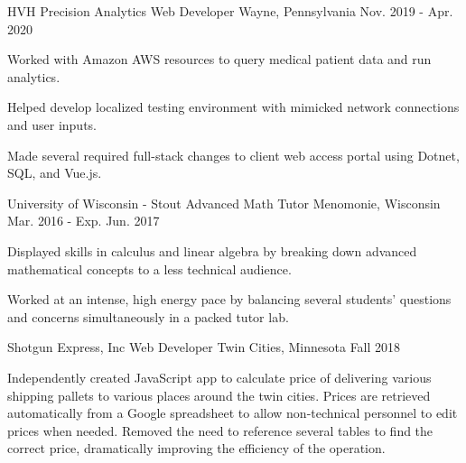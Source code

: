 \begin{cventries}
  \cventry
    {HVH Precision Analytics} %
    {Web Developer} %
    {Wayne, Pennsylvania} %
    {Nov. 2019 - Apr. 2020} %
    {
      \begin{cvitems} %
        \item {Worked with Amazon AWS resources to query medical patient data and run analytics.}
        \item {Helped develop localized testing environment with mimicked network connections and user inputs.}
        \item {Made several required full-stack changes to client web access portal using Dotnet, SQL, and Vue.js.}
      \end{cvitems}
    }

  \cventry
    {University of Wisconsin - Stout} %
    {Advanced Math Tutor} %
    {Menomonie, Wisconsin} %
    {Mar. 2016 - Exp. Jun. 2017} %
    {
      \begin{cvitems} %
        \item {Displayed skills in calculus and linear algebra by breaking down advanced mathematical concepts to a less technical audience.}
        \item {Worked at an intense, high energy pace by balancing several students’ questions and concerns simultaneously in a packed tutor lab.}
      \end{cvitems}
    }

  \cventry
    {Shotgun Express, Inc}
    {Web Developer}
    {Twin Cities, Minnesota} %
    {Fall 2018} %
    {
      \begin{cvitems} %
        \item {Independently created JavaScript app to calculate price of delivering various shipping pallets to various places around the twin cities. Prices are retrieved automatically from a Google spreadsheet to allow non-technical personnel to edit prices when needed. Removed the need to reference several tables to find the correct price, dramatically improving the efficiency of the operation.}
      \end{cvitems}
    }


\end{cventries}
